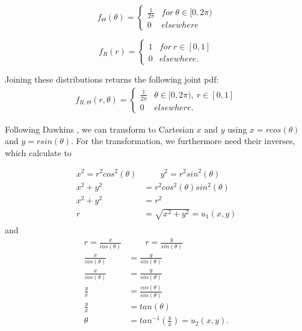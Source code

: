 \begin{equation}
f_\Theta(\theta) = 
\begin{cases} 
      \frac{1}{2\pi} & for~\theta \in [0,2\pi)\\
      0&elsewhere
   \end{cases}
\label{eq:theta_untransformed}
\end{equation}

\begin{equation}
f_R(r) = 
\begin{cases} 
      1 & for~r\in[0,1]\\
      0&elsewhere.
   \end{cases}
\label{eq:r_untransformed}
\end{equation}

Joining these distributions returns the following joint pdf:
\begin{equation}
\begin{split}
f_{R,\Theta}(r,\theta) = 
\begin{cases} 
      \frac{1}{2\pi} & \theta \in [0,2\pi),~ r\in[0,1]\\
      0&elsewhere.
   \end{cases}
\end{split}
\label{eq:joint_pdf_untransformed}
\end{equation}

Following Dawkins \cite{dawkins}, we can transform to Cartesian $x$ and $y$ using $x = rcos(\theta)$ and $y=rsin(\theta)$. For the transformation, we furthermore need their inverses, which calculate to 

\begin{align*}
x^2=r^2cos^2(\theta)& \qquad y^2=r^2sin^2(\theta)\\
x^2+y^2&=r^2cos^2(\theta)sin^2(\theta)\\
x^2+y^2&=r^2\\
r &= \sqrt{x^2+y^2} = u_1(x,y)\\
\label{eq:r-1}
\end{align*}
and
\begin{align*}
 r = \frac{x}{cos(\theta)}& \qquad r = \frac{y}{sin(\theta)}\\
 \frac{x}{cos(\theta)} &= \frac{y}{sin(\theta)}\\
 \frac{x}{cos(\theta)} &= \frac{y}{sin(\theta)}\\
 \frac{y}{x} &= \frac{cos(\theta)}{sin(\theta)}\\
 \frac{y}{x} &= tan(\theta)\\
 \theta &= tan^{-1}\left(\frac{y}{x}\right) = u_2(x,y).
\label{eq:theta-1}
\end{align*}


